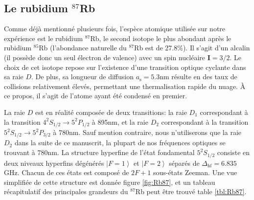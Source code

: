 \subsection{Le rubidium ${}^{87}$Rb}
Comme déjà mentionné plusieurs fois, l'espèce atomique utilisée sur notre expérience est le rubidium ${}^{87}$Rb, le second isotope le plus abondant après le rubidium ${}^{85}$Rb (l'abondance naturelle du ${}^{87}$Rb est de 27.8\%). Il s'agit d'un alcalin (il possède donc un seul électron de valence) avec un spin nucléaire $\mathbf{I}=3/2$. Le choix de cet isotope repose sur l'existence d'une transition optique cyclante dans sa raie $D$. De plus, sa longueur de diffusion $a_{\mathrm{s}}=5.3$nm résulte en des taux de collisions relativement élevés, permettant une thermalisation rapide du nuage. À ce propos, il s'agit de l'atome ayant été condensé en premier. \citep{anderson1995observation}

La raie $D$ est en réalité composée de deux transitions: la raie $D_1$ correspondant à la transition $4^2S_{1/2}\rightarrow5^2P_{1/2}$ à 895nm, et la raie $D_2$ correspondant à la transition $5^2S_{1/2}\rightarrow5^2P_{3/2}$ à 780nm. Sauf mention contraire, nous n'utiliserons que la raie $D_2$ dans la suite de ce manuscrit, la plupart de nos fréquences optiques se trouvant à 780nm. La structure hyperfine de l'état fondamental $5^2S_{1/2}$ consiste en deux niveaux hyperfins dégénérés $\left| F=1 \right\rangle$ et $\left| F=2 \right\rangle$ séparés de $\Delta_{\mathrm{hf}}=6.835$GHz. Chacun de ces états est composé de $2F+1$ sous-états Zeeman. Une vue simplifiée de cette structure est donnée figure \ref{fig:Rb87}, et un tableau récapitulatif des principales grandeurs du ${}^{87}$Rb peut être trouvé table \ref{tbl:Rb87}.

